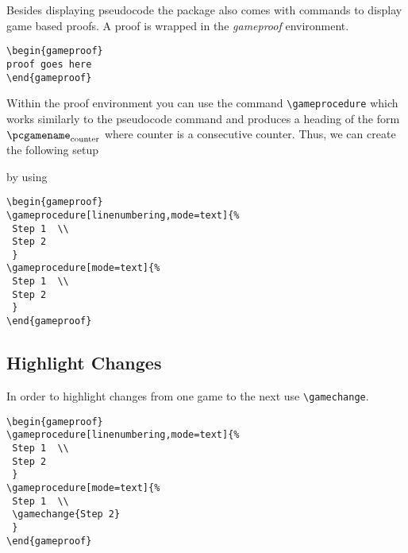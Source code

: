 \documentclass[a4paper]{report}
\begin{document}
Besides displaying pseudocode the package also comes with commands to display game based proofs. A proof
is wrapped in the \emph{gameproof} environment. 
\begin{lstlisting}
\begin{gameproof}
proof goes here
\end{gameproof}
\end{lstlisting}
Within the proof environment you can use the command \lstinline$\gameprocedure$ which works similarly to the pseudocode
command and produces a heading of the form $\pcgamename_{\text{counter}}$ where counter is a consecutive counter.
Thus, we can create the following setup
\begin{center}
\begin{gameproof}
\end{gameproof}
\end{center}
by using
\begin{lstlisting}
\begin{gameproof}
\gameprocedure[linenumbering,mode=text]{%
 Step 1  \\
 Step 2  
 }
\gameprocedure[mode=text]{%
 Step 1  \\
 Step 2  
 }
\end{gameproof}
\end{lstlisting}



\subsection{Highlight Changes}
In order to highlight changes from one game to the next use \lstinline$\gamechange$.
\begin{center}
\begin{gameproof}
\end{gameproof}
\end{center}
\begin{lstlisting}
\begin{gameproof}
\gameprocedure[linenumbering,mode=text]{%
 Step 1  \\
 Step 2  
 }
\gameprocedure[mode=text]{%
 Step 1  \\
 \gamechange{Step 2}
 }
\end{gameproof}
\end{lstlisting}
\end{document}
